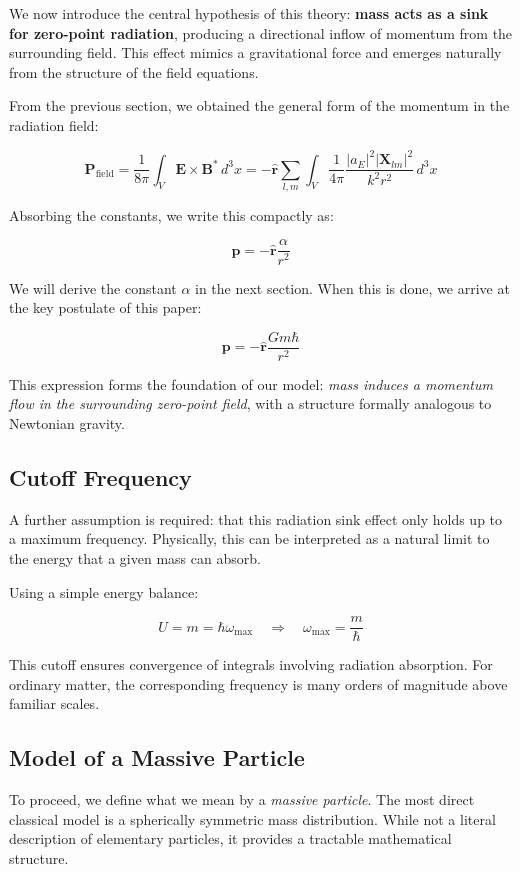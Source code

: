 \documentclass {article}
\renewcommand\vec{\mathbf}
\let\OldHat\hat
\renewcommand{\hat}[1]{\OldHat{\mathbf{#1}}}
\begin{document}
We now introduce the central hypothesis of this theory: \textbf{mass acts as a sink for zero-point radiation}, producing a directional inflow of momentum from the surrounding field. This effect mimics a gravitational force and emerges naturally from the structure of the field equations.

From the previous section, we obtained the general form of the momentum in the radiation field:

\[
\vec{P}_{\text{field}} = \frac{1}{8\pi} \int_V \vec{E} \times \vec{B}^* \, d^3x = -\hat{r} \sum_{l,m} \int_V \frac{1}{4\pi} \frac{|a_E|^2 |\vec{X}_{lm}|^2}{k^2 r^2} \, d^3x
\]

Absorbing the constants, we write this compactly as:

\[
\vec{p} = -\hat{r} \frac{\alpha}{r^2}
\]

We will derive the constant \( \alpha \) in the next section. When this is done, we arrive at the key postulate of this paper:

\[
\boxed{
	\vec{p} = -\hat{r} \frac{G m \hbar}{r^2}
}
\]

This expression forms the foundation of our model: \textit{mass induces a momentum flow in the surrounding zero-point field}, with a structure formally analogous to Newtonian gravity.

\subsection{Cutoff Frequency}

A further assumption is required: that this radiation sink effect only holds up to a maximum frequency. Physically, this can be interpreted as a natural limit to the energy that a given mass can absorb.

Using a simple energy balance:

\[
U = m = \hbar \omega_{\text{max}} \quad \Rightarrow \quad \omega_{\text{max}} = \frac{m}{\hbar}
\]

This cutoff ensures convergence of integrals involving radiation absorption. For ordinary matter, the corresponding frequency is many orders of magnitude above familiar scales.

\subsection{Model of a Massive Particle}

To proceed, we define what we mean by a \textit{massive particle}. The most direct classical model is a spherically symmetric mass distribution. While not a literal description of elementary particles, it provides a tractable mathematical structure.
\end{document}
